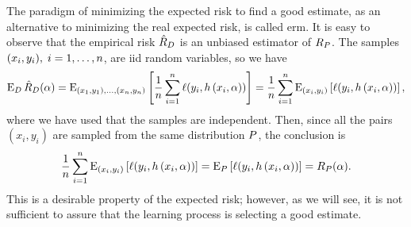 %
The paradigm of minimizing the expected risk to find a good estimate, as an alternative to minimizing the real expected risk, is called \acrfull{erm}.
%
It is easy to observe that the empirical risk $\hat{R}_{D}$ is an unbiased estimator of $R_P$. The samples $(x_i, y_i), \; i=1, \ldots, n$, are \acrfull{iid} random variables, so we have 
\begin{equation}
    \nonumber
     \operatorname{E}_D \hat{R}_{D}(\alpha) = \operatorname{E}_{(x_1, y_1), \ldots, (x_n, y_n)} \left[\frac{1}{n} \sum_{i=1}^n \ell(y_i, h\left(x_i, \alpha\right))\right] = \frac{1}{n} \sum_{i=1}^n \operatorname{E}_{(x_i, y_i)} \left[\ell(y_i, h\left(x_i, \alpha\right))\right],
\end{equation}
where we have used that the samples are independent.
Then, since all the pairs $(x_i, y_i)$ are sampled from the same distribution $P$, the conclusion is 
\begin{equation}
    \nonumber
    \frac{1}{n} \sum_{i=1}^n \operatorname{E}_{(x_i, y_i)} \left[ \ell(y_i, h\left(x_i, \alpha\right)) \right] = \operatorname{E}_{P} \left[\ell(y_i, h\left(x_i, \alpha\right)) \right] = R_P(\alpha) .
\end{equation}
This is a desirable property of the expected risk; however, as we will see, it is not sufficient to assure that the learning process is selecting a good estimate.

